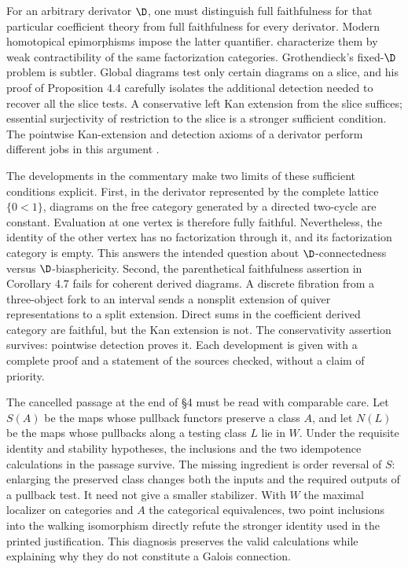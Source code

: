 For an arbitrary derivator $\D$, one must distinguish full faithfulness for
that particular coefficient theory from full faithfulness for every
derivator. Modern homotopical epimorphisms impose the latter quantifier.
\citet[Definition 6.1 and Theorem 6.10, arXiv v3]{GrothStovicek2016Trees}
characterize them by weak contractibility of the same factorization
categories. Grothendieck's fixed-$\D$ problem is subtler. Global diagrams
test only certain diagrams on a slice, and his proof of Proposition 4.4
carefully isolates the additional detection needed to recover all the slice
tests. A conservative left Kan extension from the slice suffices; essential
surjectivity of restriction to the slice is a stronger sufficient condition.
The pointwise Kan-extension and detection axioms of a derivator perform
different jobs in this argument \citep[Definition 1.5]{Groth2013}.

The developments in the commentary make two limits of these sufficient
conditions explicit. First, in the derivator represented by the complete
lattice $\{0<1\}$, diagrams on the free category generated by a directed
two-cycle are constant. Evaluation at one vertex is therefore fully
faithful. Nevertheless, the identity of the other vertex has no
factorization through it, and its factorization category is empty. This
answers the intended question about $\D$-connectedness versus
$\D$-biasphericity. Second, the parenthetical faithfulness assertion in
Corollary 4.7 fails for coherent derived diagrams. A discrete fibration from
a three-object fork to an interval sends a nonsplit extension of quiver
representations to a split extension. Direct sums in the coefficient
derived category are faithful, but the Kan extension is not. The
conservativity assertion survives: pointwise detection proves it. Each
development is given with a complete proof and a statement of the sources
checked, without a claim of priority.

The cancelled passage at the end of \S4 must be read with comparable care.
Let $S(A)$ be the maps whose pullback functors preserve a class $A$, and let
$N(L)$ be the maps whose pullbacks along a testing class $L$ lie in $W$.
Under the requisite identity and stability hypotheses, the inclusions and
the two idempotence calculations in the passage survive. The missing
ingredient is order reversal of $S$: enlarging the preserved class changes
both the inputs and the required outputs of a pullback test. It need not
give a smaller stabilizer. With $W$ the maximal localizer on categories and
$A$ the categorical equivalences, two point inclusions into the walking
isomorphism directly refute the stronger identity used in the printed
justification. This diagnosis preserves the valid calculations while
explaining why they do not constitute a Galois connection.

